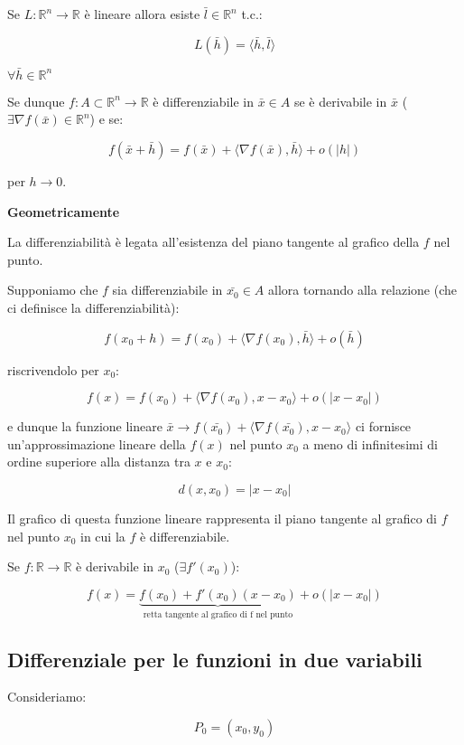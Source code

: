 \documentclass[11pt]{article}
\begin{document}
Se $L: \mathbb{R}^{n}\rightarrow \mathbb{R}$ è lineare allora esiste $\bar{l} \in \mathbb{R}^{n}$ t.c.:

\[
    L(\bar{h} ) = \langle \bar{h} , \bar{l}  \rangle
\]

$\forall \bar{h} \in \mathbb{R}^{n}$

Se dunque $f: A \subset \mathbb{R}^{n}\rightarrow \mathbb{R}$ è differenziabile in $\bar{x} \in A$ se è derivabile in $\bar{x} $ ($\exists \nabla f(\bar{x} ) \in \mathbb{R}^{n}$) e se:

\[
    f(\bar{x} + \bar{h} ) = f(\bar{x} ) + \langle \nabla f(\bar{x} ), \bar{h}  \rangle + o(|h|)
\]

per $h \rightarrow 0$.


\textbf{Geometricamente} 

La differenziabilità è legata all'esistenza del piano tangente al grafico della $f$ nel punto.

Supponiamo che $f$ sia differenziabile in $\bar{x_0} \in A $ allora tornando alla relazione (che ci definisce la differenziabilità):

\[
    f(x_0+h) = f(x_0) +\langle \nabla f(x_0) , \bar{h} \rangle  + o(\bar{h} )
\]

riscrivendolo per $x_0$:

\[
    f(x) = f(x_0) + \langle \nabla f(x_0), x-x_0 \rangle + o(|x-x_0|)
\]

e dunque la funzione lineare $\bar{x} \rightarrow  f(\bar{x_0} ) + \langle \nabla f(\bar{x_0} ), x-x_0 \rangle$ ci fornisce un'approssimazione lineare della $f(x)$ nel punto $x_0$ a meno di infinitesimi di ordine superiore alla distanza tra $x$ e $x_0$:

\[
    d(x,x_0) = |x- x_0|
\]

Il grafico di questa funzione lineare rappresenta il piano tangente al grafico di $f$ nel punto $x_0$ in cui la $f$ è differenziabile.


Se $f: \mathbb{R} \rightarrow \mathbb{R}$ è derivabile in $x_0$ ($\exists f'(x_0)$):

\[
    f(x) = \underbrace{f(x_0) + f'(x_0) (x-x_0)}_\text{retta tangente al grafico di f nel punto} + o(|x-x_0|)
\]

\subsection{Differenziale per le funzioni in due variabili} 

Consideriamo:

\[
    P_0 = (x_0,y_0)
\]
\end{document}
